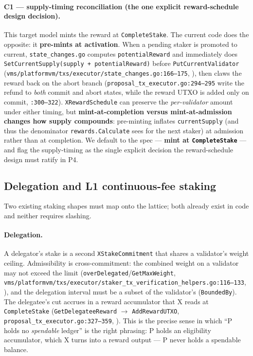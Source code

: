 \paragraph{C1 --- supply-timing reconciliation (the one explicit
reward-schedule design decision).} This target model mints the reward at
\texttt{CompleteStake}. The current code does the opposite: it
\textbf{pre-mints at activation}. When a pending staker is promoted to
current, \texttt{state\_changes.go} computes \texttt{potentialReward} and
immediately does
\texttt{SetCurrentSupply(supply + potentialReward)} before
\texttt{PutCurrentValidator}
(\texttt{vms/platformvm/txs/executor/state\_changes.go:166--175}, \IMPL{}),
then claws the reward back on the abort branch
(\texttt{proposal\_tx\_executor.go:294--295} write the refund to
\emph{both} commit and abort states, while the reward UTXO is added only
on commit, \texttt{:300--322}). \texttt{XRewardSchedule} can preserve the
\emph{per-validator} amount under either timing, but \textbf{mint-at-completion
versus mint-at-admission changes how supply compounds}: pre-minting
inflates \texttt{currentSupply} (and thus the denominator
\texttt{rewards.Calculate} sees for the next staker) at admission rather
than at completion. We default to the spec --- \textbf{mint at
\texttt{CompleteStake}} --- and flag the supply-timing as the single
explicit \DESIGN{} decision the reward-schedule design must ratify in P4.

\subsection{Delegation and L1 continuous-fee staking}
\label{sec:stake-delegation}

Two existing staking shapes must map onto the lattice; both already
exist in code and neither requires slashing.

\paragraph{Delegation.} A delegator's stake is a second
\texttt{XStakeCommitment} that shares a validator's weight ceiling.
Admissibility is cross-commitment: the combined weight on a validator may
not exceed the limit (\texttt{overDelegated}/\texttt{GetMaxWeight},
\texttt{vms/platformvm/txs/executor/\allowbreak staker\_tx\_verification\_helpers.go:116--133},
\IMPL{}), and the delegation interval must be a subset of the validator's
(\texttt{BoundedBy}). The delegatee's cut accrues in a reward accumulator
that X reads at \texttt{CompleteStake}
(\texttt{GetDelegateeReward} $\to$ \texttt{AddRewardUTXO},
\texttt{proposal\_tx\_executor.go:327--359}, \IMPL{}). This is the precise
sense in which ``P holds no \emph{spendable} ledger'' is the right
phrasing: P holds an eligibility accumulator, which X turns into a
reward output --- P never holds a spendable balance.

